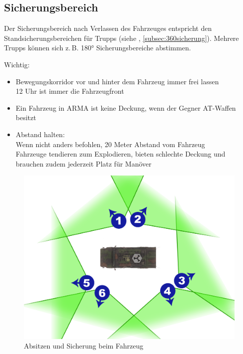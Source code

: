 \subsection{Sicherungsbereich}
Der Sicherungsbereich nach Verlassen des Fahrzeuges entspricht den Standsicherungsbereichen für  Trupps (siehe , \autoref{subsec:360sicherung}). Mehrere Trupps können sich z.\,B. 180° Sicherungsbereiche abstimmen. 
\par\medskip
Wichtig:
\begin{itemize}
	\item Bewegungskorridor vor und hinter dem Fahrzeug immer frei lassen\\ 12 Uhr ist immer die Fahrzeugfront
	\item Ein Fahrzeug in ARMA ist keine Deckung, wenn der Gegner AT-Waffen besitzt
	\item Abstand halten:\\ Wenn nicht anders befohlen, 20 Meter Abstand vom Fahrzeug\\ Fahrzeuge tendieren zum Explodieren, bieten schlechte Deckung und brauchen zudem jederzeit Platz für Manöver
\end{itemize}
\begin{figure}[htbp]
	\centering
	\includegraphics[width=15cm]{../img/basic/fahrzeug/fahrzeug_verlassen}
	\caption{Absitzen und Sicherung beim Fahrzeug}
\end{figure}

